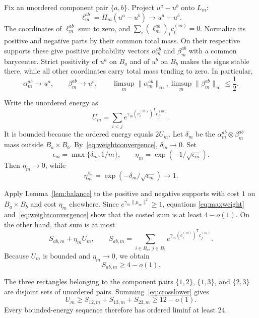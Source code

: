 \documentclass[11pt]{article}
\newcommand{\norm}[1]{\lVert #1\rVert}
\begin{document}
Fix an unordered component pair $\{a,b\}$.  Project $u^a-u^b$ onto $L_m$:
\[
 \ell_m^{ab}=\Pi_m(u^a-u^b)\longrightarrow u^a-u^b.
\]
The coordinates of $\ell_m^{ab}$ sum to zero, and
$\sum_i(\ell_m^{ab})_i c_i^{(m)}=0$.  Normalize its positive and negative
parts by their common total mass.  On their respective supports these give
positive probability vectors $\alpha_m^{ab}$ and $\beta_m^{ab}$ with a
common barycenter.  Strict positivity of $u^a$ on $B_a$ and of $u^b$ on
$B_b$ makes the signs stable there, while all other coordinates carry total
mass tending to zero.  In particular,
\begin{equation}\label{eq:weightconvergence}
 \alpha_m^{ab}\longrightarrow u^a,
 \qquad \beta_m^{ab}\longrightarrow u^b,
 \qquad
 \limsup_m\norm{\alpha_m^{ab}}_\infty,
 \limsup_m\norm{\beta_m^{ab}}_\infty\le\frac12.
\end{equation}

Write the unordered energy as
\[
 U_m=\sum_{i<j}e^{\gamma_m(c_i^{(m)})^{\mathsf T}c_j^{(m)}}.
\]
It is bounded because the ordered energy equals $2U_m$.  Let $\delta_m$ be
the $\alpha_m^{ab}\otimes\beta_m^{ab}$ mass outside $B_a\times B_b$.
By~\eqref{eq:weightconvergence}, $\delta_m\to0$.  Set
\begin{equation}\label{eq:eta}
 \epsilon_m=\max\{\delta_m,1/m\},
 \qquad \eta_m=\exp(-1/\sqrt{\epsilon_m}).
\end{equation}
Then $\eta_m\to0$, while
\[
 \eta_m^{\delta_m}
 =\exp(-\delta_m/\sqrt{\epsilon_m})\longrightarrow1.
\]

Apply Lemma~\ref{lem:balance} to the positive and negative supports with cost
$1$ on $B_a\times B_b$ and cost $\eta_m$ elsewhere.  Since
$e^{\gamma_m\norm{\mu_m}^2}\ge1$, equations
\eqref{eq:maxweight} and~\eqref{eq:weightconvergence} show that the costed
sum is at least $4-o(1)$.  On the other hand, that sum is at most
\[
 S_{ab,m}+\eta_m U_m,
 \qquad
 S_{ab,m}=\sum_{i\in B_a,\,j\in B_b}
 e^{\gamma_m(c_i^{(m)})^{\mathsf T}c_j^{(m)}}.
\]
Because $U_m$ is bounded and $\eta_m\to0$, we obtain
\begin{equation}\label{eq:crosslower}
 S_{ab,m}\ge4-o(1).
\end{equation}

The three rectangles belonging to the component pairs
$\{1,2\}$, $\{1,3\}$, and $\{2,3\}$ are disjoint sets of unordered pairs.
Summing~\eqref{eq:crosslower} gives
\[
 U_m\ge S_{12,m}+S_{13,m}+S_{23,m}\ge12-o(1).
\]
Every bounded-energy sequence therefore has ordered liminf at least $24$.
\end{document}

